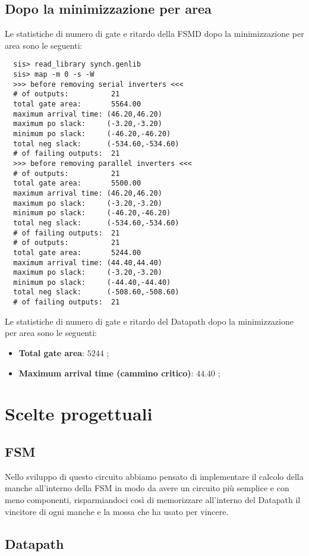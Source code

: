 \documentclass[a4paper]{article}
\begin{document}
\subsection{Dopo la minimizzazione per area}
Le statistiche di numero di gate e ritardo della FSMD dopo la minimizzazione per area sono le seguenti:
\begin{lstlisting}
  sis> read_library synch.genlib
  sis> map -m 0 -s -W
  >>> before removing serial inverters <<<
  # of outputs:          21
  total gate area:       5564.00
  maximum arrival time: (46.20,46.20)
  maximum po slack:     (-3.20,-3.20)
  minimum po slack:     (-46.20,-46.20)
  total neg slack:      (-534.60,-534.60)
  # of failing outputs:  21
  >>> before removing parallel inverters <<<
  # of outputs:          21
  total gate area:       5500.00
  maximum arrival time: (46.20,46.20)
  maximum po slack:     (-3.20,-3.20)
  minimum po slack:     (-46.20,-46.20)
  total neg slack:      (-534.60,-534.60)
  # of failing outputs:  21
  # of outputs:          21
  total gate area:       5244.00
  maximum arrival time: (44.40,44.40)
  maximum po slack:     (-3.20,-3.20)
  minimum po slack:     (-44.40,-44.40)
  total neg slack:      (-508.60,-508.60)
  # of failing outputs:  21
\end{lstlisting}
\noindent Le statistiche di numero di gate e ritardo del Datapath dopo la minimizzazione per area sono le seguenti:
\begin{itemize}
  \item \textbf{Total gate area}: \( 5244 \) ;
  \item \textbf{Maximum arrival time (cammino critico)}: \( 44.40 \) ;
\end{itemize}

\section{Scelte progettuali}
\subsection{FSM}
Nello sviluppo di questo circuito abbiamo pensato di implementare il calcolo della manche all'interno della
FSM in modo da avere un circuito più semplice e con meno componenti, risparmiandoci così di memorizzare
all'interno del Datapath il vincitore di ogni manche e la mossa che ha usato per vincere.

\subsection{Datapath}
\end{document}
